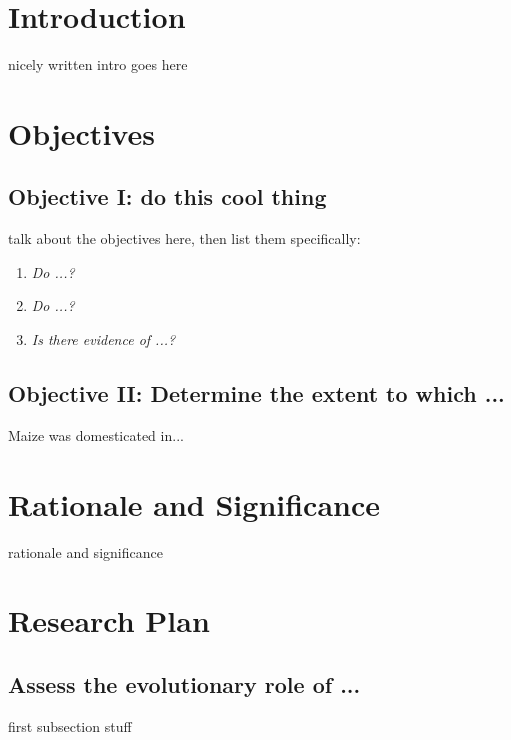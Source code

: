 
\section*{Introduction}
 nicely written intro goes here
 

\section*{Objectives}
\subsection*{Objective I: do this cool thing}
talk about the objectives here, then list them specifically:

\begin{enumerate}
\item \emph{Do ...?}
\item \emph{Do ...?}
\item \emph{Is there evidence of ...?}
\end{enumerate}

\subsection*{Objective II: Determine the extent to which ...}
Maize was domesticated in...


\section*{Rationale and Significance} 
 rationale and significance

\section*{Research Plan}


\subsection*{Assess the evolutionary role of ...}
first subsection stuff


